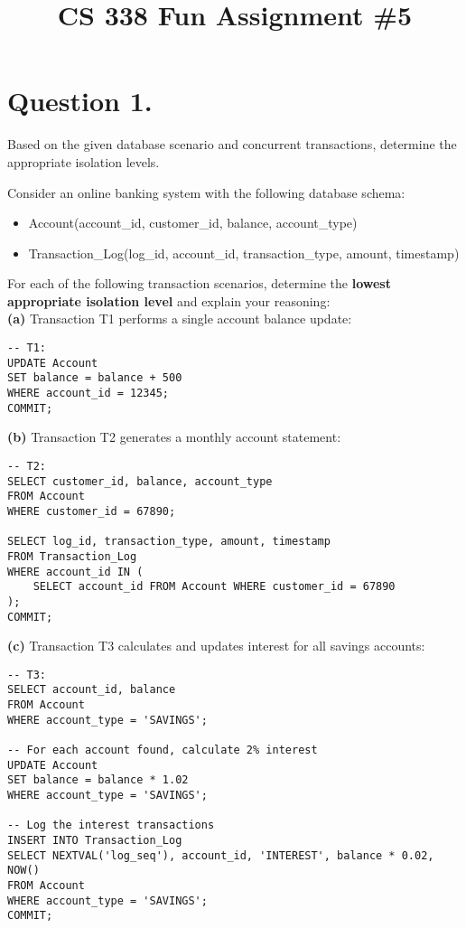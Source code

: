 \documentclass{article}
\title{CS 338 Fun Assignment \#5}
\author{}
\date{}
\begin{document}
\maketitle

\section*{Question 1.}
Based on the given database scenario and concurrent transactions, 
determine the appropriate isolation levels.

Consider an online banking system with the following database schema:
\begin{itemize}
    \item Account(account\_id, customer\_id, balance, account\_type)
    \item Transaction\_Log(log\_id, account\_id, transaction\_type, amount, timestamp)
\end{itemize}


For each of the following transaction scenarios, determine the 
\textbf{lowest appropriate isolation level} and explain your reasoning:\\

\textbf{(a)} Transaction T1 performs a single account balance update:
\begin{verbatim}
-- T1:
UPDATE Account 
SET balance = balance + 500 
WHERE account_id = 12345;
COMMIT;
\end{verbatim}

\textbf{(b)} Transaction T2 generates a monthly account statement:
\begin{verbatim}
-- T2:
SELECT customer_id, balance, account_type 
FROM Account 
WHERE customer_id = 67890;

SELECT log_id, transaction_type, amount, timestamp 
FROM Transaction_Log 
WHERE account_id IN (
    SELECT account_id FROM Account WHERE customer_id = 67890
);
COMMIT;
\end{verbatim}


\textbf{(c)} Transaction T3 calculates and updates interest for all savings accounts:
\begin{verbatim}
-- T3:
SELECT account_id, balance 
FROM Account 
WHERE account_type = 'SAVINGS';

-- For each account found, calculate 2% interest
UPDATE Account 
SET balance = balance * 1.02 
WHERE account_type = 'SAVINGS';

-- Log the interest transactions
INSERT INTO Transaction_Log 
SELECT NEXTVAL('log_seq'), account_id, 'INTEREST', balance * 0.02, NOW()
FROM Account 
WHERE account_type = 'SAVINGS';
COMMIT;
\end{verbatim}
\end{document}
